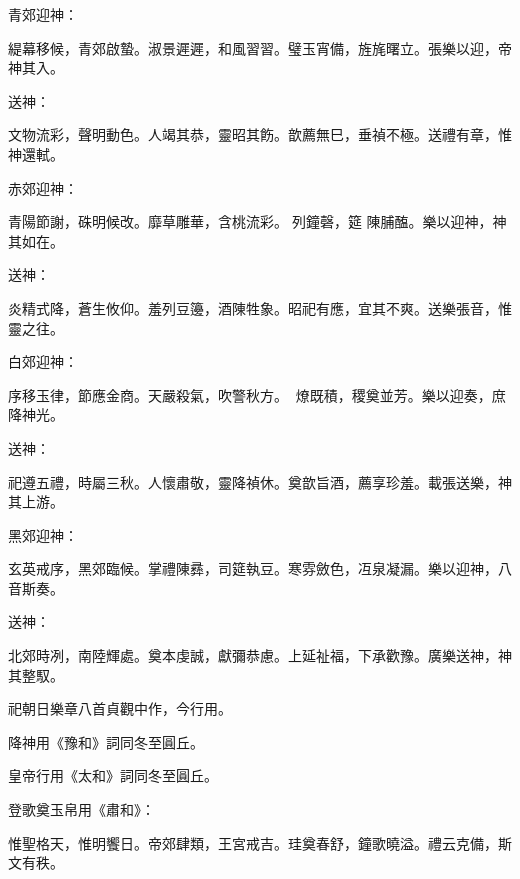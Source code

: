 \begin{pinyinscope}
 青郊迎神：



 緹幕移候，青郊啟蟄。淑景遲遲，和風習習。璧玉宵備，旌旄曙立。張樂以迎，帝神其入。



 送神：



 文物流彩，聲明動色。人竭其恭，靈昭其飭。歆薦無巳，垂禎不極。送禮有章，惟神還軾。



 赤郊迎神：



 青陽節謝，硃明候改。靡草雕華，含桃流彩。列鐘磬，筵
 陳脯醢。樂以迎神，神其如在。



 送神：



 炎精式降，蒼生攸仰。羞列豆籩，酒陳牲象。昭祀有應，宜其不爽。送樂張音，惟靈之往。



 白郊迎神：



 序移玉律，節應金商。天嚴殺氣，吹警秋方。燎既積，稷奠並芳。樂以迎奏，庶降神光。



 送神：



 祀遵五禮，時屬三秋。人懷肅敬，靈降禎休。奠歆旨酒，薦享珍羞。載張送樂，神其上游。



 黑郊迎神：



 玄英戒序，黑郊臨候。掌禮陳彞，司筵執豆。寒雰斂色，冱泉凝漏。樂以迎神，八音斯奏。



 送神：



 北郊時冽，南陸輝處。奠本虔誠，獻彌恭慮。上延祉福，下承歡豫。廣樂送神，神其整馭。



 祀朝日樂章八首貞觀中作，今行用。



 降神用《豫和》詞同冬至圓丘。



 皇帝行用《太和》詞同冬至圓丘。



 登歌奠玉帛用《肅和》：



 惟聖格天，惟明饗日。帝郊肆類，王宮戒吉。珪奠春舒，鐘歌曉溢。禮云克備，斯文有秩。




\end{pinyinscope}
